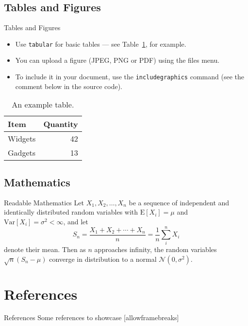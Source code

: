 \documentclass[10pt]{beamer}
\begin{document}
\subsection{Tables and Figures}
\begin{frame}{Tables and Figures}
  \begin{itemize}
    \item Use \texttt{tabular} for basic tables --- see Table~\ref{tab:widgets}, for example.
    \item You can upload a figure (JPEG, PNG or PDF) using the files menu.
    \item To include it in your document, use the \texttt{includegraphics} command (see the comment below in the source code).
  \end{itemize}


  \begin{table}
    \centering
    \begin{tabular}{l|r}
    Item & Quantity \\\hline
    Widgets & 42 \\
    Gadgets & 13
    \end{tabular}
    \caption{\label{tab:widgets}An example table.}
  \end{table}
\end{frame}

\subsection{Mathematics}
\begin{frame}{Readable Mathematics}
  Let $X_1, X_2, \ldots, X_n$ be a sequence of independent and identically distributed random variables with $\text{E}[X_i] = \mu$ and $\text{Var}[X_i] = \sigma^2 < \infty$, and let
  $$S_n = \frac{X_1 + X_2 + \cdots + X_n}{n}
        = \frac{1}{n}\sum_{i}^{n} X_i$$
  denote their mean. Then as $n$ approaches infinity, the random variables $\sqrt{n}(S_n - \mu)$ converge in distribution to a normal $\mathcal{N}(0, \sigma^2)$.
\end{frame}

\section{References}
\begin{frame}{References}
  Some references to showcase [allowframebreaks] \cite{knuth92,ConcreteMath,Simpson,Er01,greenwade93}
\end{frame}
\end{document}
